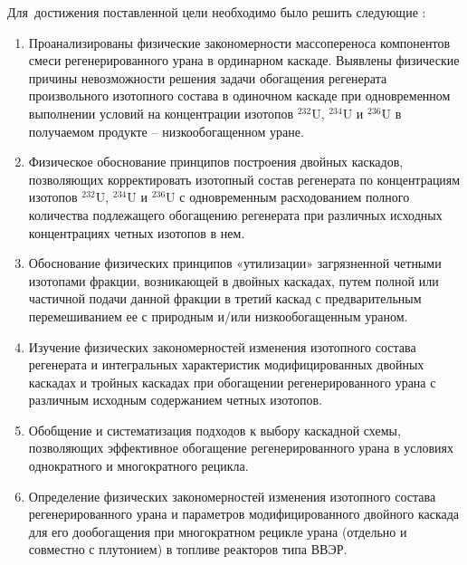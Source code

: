 Для~достижения поставленной цели необходимо было решить следующие {\tasks}:
\begin{enumerate}
  \item Проанализированы физические закономерности массопереноса компонентов смеси
  регенерированного урана в ординарном каскаде. Выявлены физические причины
  невозможности решения задачи обогащения регенерата произвольного изотопного
  состава в одиночном каскаде при одновременном выполнении условий на
  концентрации изотопов $^{232}$U, $^{234}$U и $^{236}$U в получаемом продукте – низкообогащенном уране.
  \item Физическое обоснование принципов построения двойных каскадов,
  позволяющих корректировать изотопный состав регенерата по концентрациям
  изотопов $^{232}$U, $^{234}$U и $^{236}$U с одновременным расходованием полного количества
  подлежащего обогащению регенерата при различных исходных концентрациях
  четных изотопов в нем.
  \item Обоснование физических принципов «утилизации» загрязненной четными
  изотопами фракции, возникающей в двойных каскадах, путем полной или
  частичной подачи данной фракции в третий каскад с предварительным
  перемешиванием ее с природным и/или низкообогащенным ураном.
  \item Изучение физических закономерностей изменения изотопного состава регенерата и
  интегральных характеристик модифицированных двойных каскадах и тройных
  каскадах при обогащении регенерированного урана с различным исходным
  содержанием четных изотопов.
  \item Обобщение и систематизация подходов к выбору каскадной схемы, позволяющих
  эффективное обогащение регенерированного урана в условиях однократного и
  многократного рецикла.
  \item Определение физических закономерностей изменения изотопного состава
  регенерированного урана и параметров модифицированного двойного каскада для
  его дообогащения при многократном рецикле урана (отдельно и совместно с
  плутонием) в топливе реакторов типа ВВЭР.
\end{enumerate}


